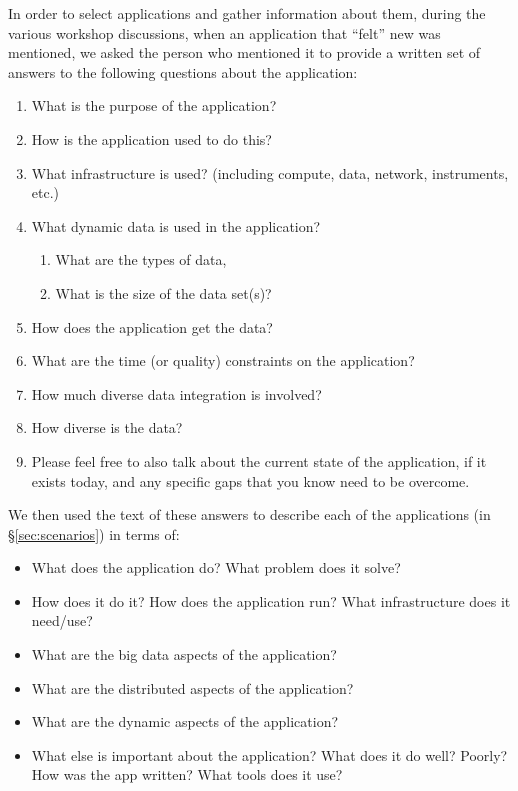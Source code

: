 In order to select applications and gather information about
them, during the various workshop discussions, when an
application that ``felt'' new was mentioned, we asked the person who
mentioned it to provide a written set of answers to the following questions about the
application:

\begin{enumerate}
\item What is the purpose of the application?
\item How is the application used to do this?
\item What infrastructure is used? (including compute, data, network, instruments, etc.)
\item What dynamic data is used in the application?
\begin{enumerate}
\item What are the types of data,
\item What is the size of the data set(s)?
\end{enumerate}
\item How does the application get the data?
\item What are the time (or quality) constraints on the application?
\item How much diverse data integration is involved?
\item How diverse is the data?
\item Please feel free to also talk about the current state of the
application, if it exists today, and any specific gaps that you know
need to be overcome.
\end{enumerate}

We then used the text of these answers to describe each of the applications (in \S\ref{sec:scenarios}) in terms of:

\begin{itemize}
\item What does the application do? What problem does it solve?
\item How does it do it? How does the application run?  What infrastructure does it need/use?
\item What are the big data aspects of the application?
\item What are the distributed aspects of the application?
\item What are the dynamic aspects  of the application?
\item What else is important about the application?  What does it do well?  Poorly? How was the app written? What tools does it use?
\end{itemize}

